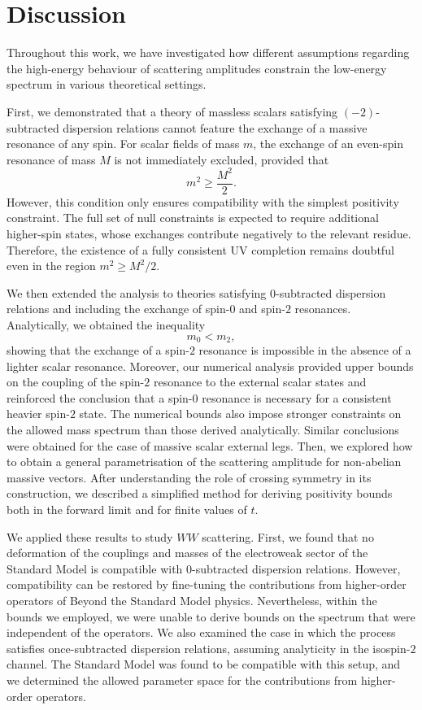 \chapter{Discussion}

Throughout this work, we have investigated how different assumptions regarding the high-energy behaviour of scattering amplitudes constrain the low-energy spectrum in various theoretical settings.

First, we demonstrated that a theory of massless scalars satisfying \((-2)\)-subtracted dispersion relations cannot feature the exchange of a massive resonance of any spin. For scalar fields of mass \(m\), the exchange of an even-spin resonance of mass \(M\) is not immediately excluded, provided that
\[
m^2 \geq \frac{M^2}{2}.
\]
However, this condition only ensures compatibility with the simplest positivity constraint. The full set of null constraints is expected to require additional higher-spin states, whose exchanges contribute negatively to the relevant residue. Therefore, the existence of a fully consistent UV completion remains doubtful even in the region \(m^2 \geq M^2/2\).

We then extended the analysis to theories satisfying \(0\)-subtracted dispersion relations and including the exchange of spin-\(0\) and spin-\(2\) resonances. Analytically, we obtained the inequality
\[
m_0 < m_2,
\]
showing that the exchange of a spin-\(2\) resonance is impossible in the absence of a lighter scalar resonance. Moreover, our numerical analysis provided upper bounds on the coupling of the spin-\(2\) resonance to the external scalar states and reinforced the conclusion that a spin-\(0\) resonance is necessary for a consistent heavier spin-\(2\) state. The numerical bounds also impose stronger constraints on the allowed mass spectrum than those derived analytically. Similar conclusions were obtained for the case of massive scalar external legs.
Then, we explored how to obtain a general parametrisation of the scattering amplitude for non-abelian massive vectors. After understanding the role of crossing symmetry in its construction, we described a simplified method for deriving positivity bounds both in the forward limit and for finite values of $t$.

We applied these results to study $WW$ scattering. First, we found that no deformation of the couplings and masses of the electroweak sector of the Standard Model is compatible with $0$-subtracted dispersion relations. However, compatibility can be restored by fine-tuning the contributions from higher-order operators of Beyond the Standard Model physics. Nevertheless, within the bounds we employed, we were unable to derive bounds on the spectrum that were independent of the operators. We also examined the case in which the process satisfies once-subtracted dispersion relations, assuming analyticity in the isospin-$2$ channel. The Standard Model was found to be compatible with this setup, and we determined the allowed parameter space for the contributions from higher-order operators.
